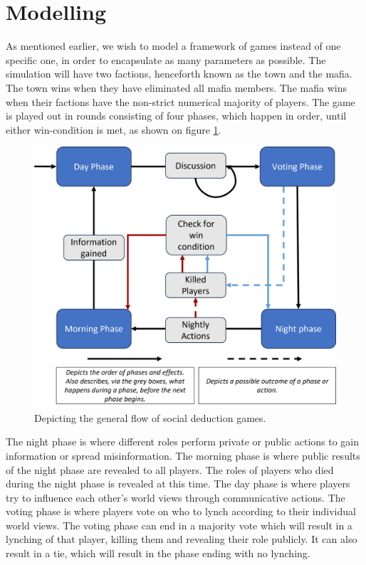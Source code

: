 \section{Modelling}
As mentioned earlier, we wish to model a framework of games instead of one
specific one, in order to encapsulate as many parameters as possible. The
simulation will have two factions, henceforth known as the town and the mafia. The
town wins when they have eliminated all mafia members. The mafia wins when
their factions have the non-strict numerical majority of players. The game is
played out in rounds consisting of four phases, which happen in order, until
either win-condition is met, as shown on figure \ref{fig:GameOverview}.
\begin{figure}[H]
	\includegraphics[width=1\linewidth]{figures/Game_overview}
	\caption{Depicting the general flow of social deduction games.}
	\label{fig:GameOverview}
\end{figure}

The night phase is where different roles perform private or public actions to
gain information or spread misinformation. The morning phase is where public
results of the night phase are revealed to all players. The roles of players who
died during the night phase is revealed at this time. The day phase is where
players try to influence each other's world views through communicative actions. The voting phase is where players vote on who
to lynch according to their individual world views. The voting phase can end in
a majority vote which will result in a lynching of that player, killing them
and revealing their role publicly. It can also result in a tie, which will result in the phase
ending with no lynching.


